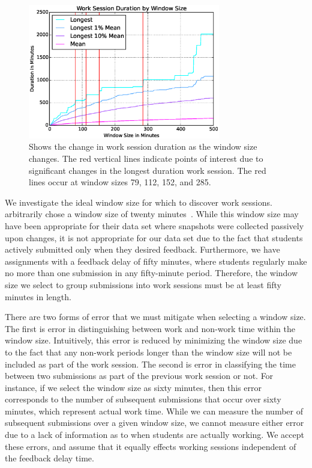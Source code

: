 \begin{figure}[!t]
\centering
\includegraphics[width=3.3in]{graphs/Work_Session_Duration_by_Window_Size.eps}
\caption{Shows the change in work session duration as the window size
  changes. The red vertical lines indicate points of interest due to
  significant changes in the longest duration work session. The red lines occur
  at window sizes 79, 112, 152, and 285.}
\end{figure}

We investigate the ideal window size for which to discover work
sessions. \spacco{} arbitrarily chose a window size of twenty
minutes~\cite{Spacco:2013:TIP:2462476.2465594}. While this window size may have
been appropriate for their data set where snapshots were collected passively
upon changes, it is not appropriate for our data set due to the fact that
students actively submitted only when they desired feedback. Furthermore, we
have assignments with a feedback delay of fifty minutes, where students
regularly make no more than one submission in any fifty-minute
period. Therefore, the window size we select to group submissions into work
sessions must be at least fifty minutes in length.

There are two forms of error that we must mitigate when selecting a window
size. The first is error in distinguishing between work and non-work time
within the window size. Intuitively, this error is reduced by minimizing the
window size due to the fact that any non-work periods longer than the window
size will not be included as part of the work session. The second is error in
classifying the time between two submissions as part of the previous work
session or not. For instance, if we select the window size as sixty minutes,
then this error corresponds to the number of subsequent submissions that occur
over sixty minutes, which represent actual work time. While we can measure the
number of subsequent submissions over a given window size, we cannot measure
either error due to a lack of information as to when students are actually
working. We accept these errors, and assume that it equally effects working
sessions independent of the feedback delay time.

